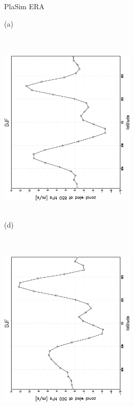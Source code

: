 \documentclass[12pt,a4paper,twoside,openright,headinclude,liststotoc,bibtotoc]{scrreprt}
\begin{document}
\begin{appendix}
\begin{figure}[c]
\hspace{4.0cm}PlaSim \vspace{0.2cm} \hspace{7.3cm} ERA \\
\parbox{8.5cm}{\hspace{0.90cm}\begin{scriptsize}(a) \end{scriptsize} \vspace{-0.5cm} \\
\includegraphics[height=8.5cm,width=6.5cm,angle=-90]
{eps/zonysmu_850DJF.eps}
}
\parbox{8.5cm}{\hspace{0.90cm}\begin{scriptsize}(d) \end{scriptsize} \vspace{-0.5cm} \\
\includegraphics[height=8.5cm,width=6.5cm,angle=-90]
{eps/t21zonysmuvel131DJF850.eps}
}
\end{figure}
\end{appendix}
\end{document}
